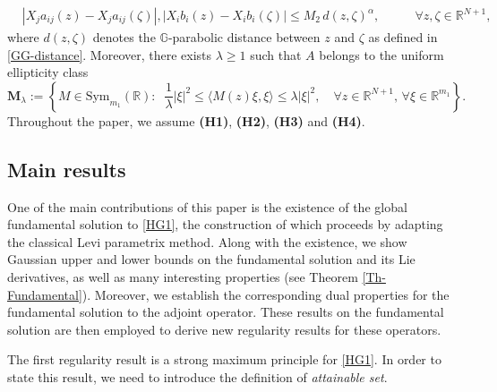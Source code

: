 \documentclass[11pt,a4paper]{article}
\numberwithin{equation}{section}
\newcommand{\R}{\mathbb{R}}
\def \rnn {{\mathbb {R}}^{N+1}}
\def \GG {{\mathbb{G}}}
\def \a {{\alpha}}
\def \l {{\lambda}}
\def \x {{\xi}}
\def \z {{\zeta}}
\begin{document}
{{\begin{equation}
\begin{aligned}
		&\!\!\!\!\!\!\!\!\!\!\!\!|X_ja_{ij}(z)-X_ja_{ij}(\z)|,|X_ib_{i}(z)-X_ib_i(\z)|\leq M_2\,d(z,\z)^\a, \qquad &\forall z,\z\in \rnn,
	\end{aligned}
\end{equation}
where $d(z,\zeta)$ denotes the $\GG$-parabolic distance between $z$ and $\zeta$ as defined in \eqref{GG-distance}. Moreover, there exists $\l\geq 1$ such that $A$ belongs to the uniform ellipticity class 
\begin{equation}\label{def-ellipticity-class}
	\textbf{M}_\l:=\left\{M\in \text{Sym}_{m_1}(\R): \;\;\frac{1}{\l}|\xi|^2\leq \langle M(z)\x,\x\rangle \leq \l |\x|^2,\quad \forall z \in \rnn,\, \forall \x \in \R^{m_1}\right\}.
\end{equation}}
Throughout the paper, we assume \textbf{(H1)}, \textbf{(H2)}, \textbf{(H3)} and \textbf{(H4)}.

\subsection{Main results}
One of the main contributions of this paper is the existence of the global fundamental solution to \eqref{HG1}, the construction of which proceeds by adapting the classical Levi parametrix method. Along with the existence, we show Gaussian upper and lower bounds on the fundamental solution and its Lie derivatives, as well as many interesting properties (see Theorem \ref{Th-Fundamental}). Moreover, we establish the corresponding dual properties for the fundamental solution to the adjoint operator. These results on the fundamental solution are then employed to derive new regularity results for these operators.

\medskip
	
The first regularity result is a strong maximum principle for \eqref{HG1}. In order to state this result, we need to introduce the definition of \emph{attainable set}.


}
\end{document}
